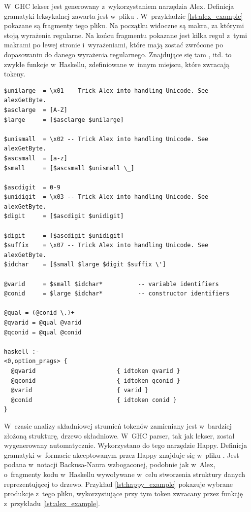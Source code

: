 W~GHC lekser jest generowany z~wykorzystaniem narzędzia Alex. Definicja
gramatyki leksykalnej zawarta jest w~pliku . W~przykładzie
\ref{lst:alex_example} pokazane są fragmenty tego pliku. Na początku widoczne są
makra, za którymi stoją wyrażenia regularne. Na końcu fragmentu pokazane jest
kilka reguł z~tymi makrami po lewej stronie i~wyrażeniami, które mają zostać
zwrócone po dopasowaniu do danego wyrażenia regularnego. Znajdujące się tam
,  itd. to zwykłe funkcje w~Haskellu, zdefiniowane
w~innym miejscu, które zwracają tokeny\cite{DocsAlex}.

\begin{lstlisting}[float,label={lst:alex_example},
                   caption={Wycinki z pliku \code{Lexer.x} składające się na reguły opisujące co jest wyodrębniane jako zmienna i konstruktor.}]
$unilarge  = \x01 -- Trick Alex into handling Unicode. See alexGetByte.
$asclarge  = [A-Z]
$large     = [$asclarge $unilarge]

$unismall  = \x02 -- Trick Alex into handling Unicode. See alexGetByte.
$ascsmall  = [a-z]
$small     = [$ascsmall $unismall \_]

$ascdigit  = 0-9
$unidigit  = \x03 -- Trick Alex into handling Unicode. See alexGetByte.
$digit     = [$ascdigit $unidigit]

$digit     = [$ascdigit $unidigit]
$suffix    = \x07 -- Trick Alex into handling Unicode. See alexGetByte.
$idchar    = [$small $large $digit $suffix \']

@varid     = $small $idchar*          -- variable identifiers
@conid     = $large $idchar*          -- constructor identifiers

@qual = (@conid \.)+
@qvarid = @qual @varid
@qconid = @qual @conid

haskell :-
<0,option_prags> {
  @qvarid                       { idtoken qvarid }
  @qconid                       { idtoken qconid }
  @varid                        { varid }
  @conid                        { idtoken conid }
}
\end{lstlisting}

W~czasie analizy składniowej strumień tokenów zamieniany jest w~bardziej złożoną
strukturę, drzewo składniowe. W~GHC parser, tak jak lekser, został wygenerowany
automatycznie. Wykorzystano do tego narzędzie Happy. Definicja gramatyki w~formacie akceptowanym
przez Happy znajduje się w~pliku . Jest podana w~notacji Backusa-Naura
wzbogaconej, podobnie jak w~Alex, o~fragmenty kodu w~Haskellu wywoływane w~celu
stworzenia struktury danych reprezentującej to drzewo\cite{DocsHappy}. Przykład
\ref{lst:happy_example} pokazuje wybrane produkcje z~tego pliku, wykorzystujące
przy tym token  zwracany przez funkcję  z~przykładu
\ref{lst:alex_example}.


